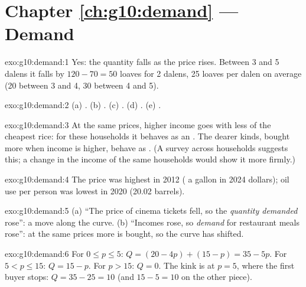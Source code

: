 \section*{Chapter \ref{ch:g10:demand} --- Demand}

\begin{solution}{exo:g10:demand:1}
Yes: the quantity falls as the price rises. Between 3 and 5 dalens it falls by $120 - 70 = 50$ loaves for 2 dalens, 25 loaves
per dalen on average (20 between 3 and 4, 30 between 4 and 5).
\end{solution}

\begin{solution}{exo:g10:demand:2}
(a) . (b) . (c) . (d) . (e) .
\end{solution}

\begin{solution}{exo:g10:demand:3}
At the same prices, higher income goes with less of the cheapest rice: for these households it behaves as an .
The dearer kinds, bought more when income is higher, behave as . (A survey across households suggests this; a
change in the income of the same households would show it more firmly.)
\end{solution}

\begin{solution}{exo:g10:demand:4}
The price was highest in 2012 ( a gallon in 2024 dollars); oil use per person was lowest in 2020 (20.02 barrels).
\end{solution}

\begin{solution}{exo:g10:demand:5}
(a) ``The price of cinema tickets fell, so the \emph{quantity demanded} rose'': a move along the curve. (b) ``Incomes rose, so
\emph{demand} for restaurant meals rose'': at the same prices more is bought, so the curve has shifted.
\end{solution}

\begin{solution}{exo:g10:demand:6}
For $0 \le p \le 5$: $Q = (20 - 4p) + (15 - p) = 35 - 5p$. For $5 < p \le 15$: $Q = 15 - p$. For $p > 15$: $Q = 0$. The kink is at
$p = 5$, where the first buyer stops: $Q = 35 - 25 = 10$ (and $15 - 5 = 10$ on the other piece).
\end{solution}


